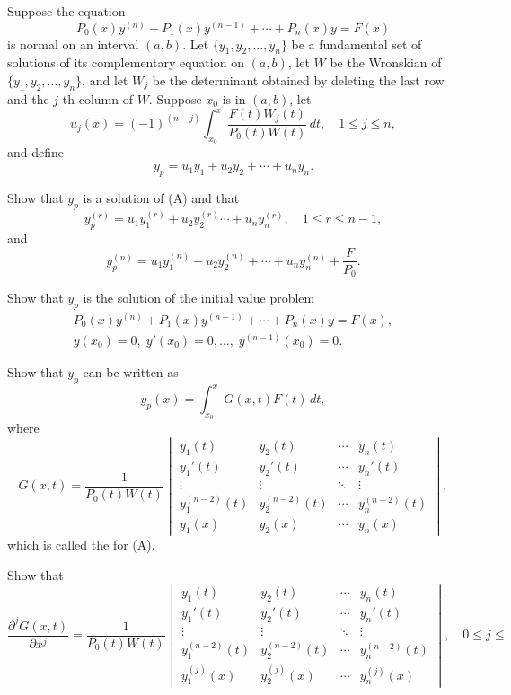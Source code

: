 \begin{exerciselist}
\item\label{exer:9.4.34}Suppose the equation
\[
P_0(x)y^{(n)}+P_1(x)y^{(n-1)}+\cdots+P_n(x)y=F(x)
\tag{A}
\]
is normal on an interval $(a,b)$. Let $\{y_1,y_2,\dots,y_n\}$ be a
fundamental set of solutions of its complementary equation on $(a,b)$,
let $W$ be the Wronskian of $\{y_1,y_2,\dots,y_n\}$, and let $W_j$ be
the determinant obtained by deleting the last row and the $j$-th
column of $W$. Suppose $x_0$ is in $(a,b)$, let
\[
u_j(x)=(-1)^{(n-j)}\int_{x_0}^x\frac{F(t)W_j(t)}{P_0(t)W(t)}\,dt,
\quad 1\le j\le n,
\]
and define
\[
y_p=u_1y_1+u_2y_2+\cdots+u_ny_n.
\]
\begin{alist}
\item %
Show that $y_p$ is a solution of (A) and that
\[
y_p^{(r)}=u_1y^{(r)}_1+u_2y_2^{(r)}\cdots+u_ny^{(r)}_n,\quad 1
\le r \le n-1,
\]
and
\[
y_p^{(n)}=u_1y_1^{(n)}+u_2y_2^{(n)}+\cdots+u_ny_n^{(n)}+\frac{F}{P_0}.
\]
\item %
Show that    $y_p$  is the
solution of the initial value problem
\begin{gather*}
P_0(x)y^{(n)}+P_1(x)y^{(n-1)}+\cdots+P_n(x)y=F(x),\\
y(x_0)=0,\;
y'(x_0)=0,\dots,\; y^{(n-1)}(x_0)=0.
\end{gather*}
\item %
Show that  $y_p$  can be written as
\[
y_p(x)=\int_{x_0}^x G(x,t)F(t)\,dt,
\]
where
\[
G(x,t)=\frac{1}{P_0(t)W(t)}\begin{vmatrix}
y_1(t)&y_2(t)&\cdots&y_n(t)\\
y_1'(t)&y_2'(t)&\cdots&y_n'(t)\\
\vdots&\vdots&\ddots&\vdots\\
y_1^{(n-2)}(t)&y_2^{(n-2)}(t)&\cdots&y_n^{(n-2)}(t)\\
y_1(x)&y_2(x)&\cdots&y_n(x)\end{vmatrix},
\]
which is called  the
 for (A).
\item %
Show that
\[
\frac{\partial^{j}G(x,t)}{\partial x^j}
=\frac{1}{P_0(t)W(t)}\begin{vmatrix}
y_1(t)&y_2(t)&\cdots&y_n(t)\\
y_1'(t)&y_2'(t)&\cdots&y_n'(t)\\
\vdots&\vdots&\ddots&\vdots\\
y_1^{(n-2)}(t)&y_2^{(n-2)}(t)&\cdots&y_n^{(n-2)}(t)\\
y_1^{(j)}(x)&y_2^{(j)}(x)&\cdots&y_n^{(j)}(x)\end{vmatrix},\quad 0\le j\le
\]
\end{alist}
\end{exerciselist}
